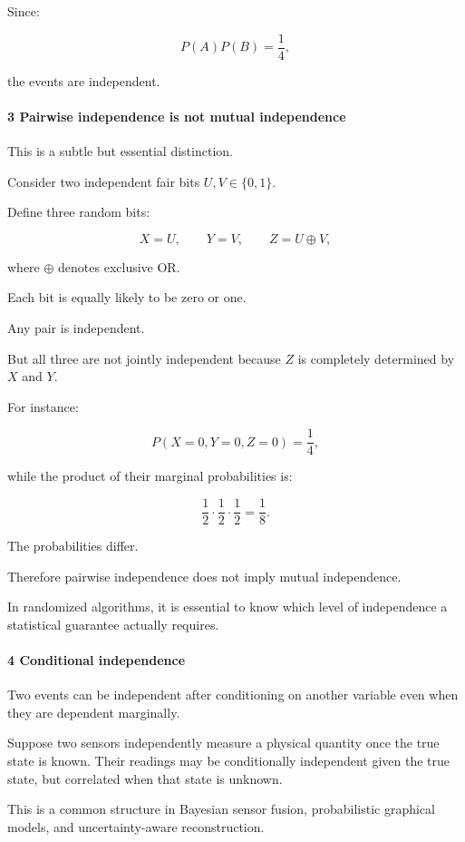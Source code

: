 Since:

\[
 P(A)P(B)=\frac14,
\]

the events are independent.

\paragraph{3 Pairwise independence is not mutual independence}\label{pairwise-independence-is-not-mutual-independence}

This is a subtle but essential distinction.

Consider two independent fair bits \(U,V\in\{0,1\}\).

Define three random bits:

\[
 X=U, \qquad Y=V, \qquad Z=U\oplus V,
\]

where \(\oplus\) denotes exclusive OR.

Each bit is equally likely to be zero or one.

Any pair is independent.

But all three are not jointly independent because \(Z\) is completely determined by \(X\) and \(Y\).

For instance:

\[
 P(X=0,Y=0,Z=0)=\frac14,
\]

while the product of their marginal probabilities is:

\[
 \frac12\cdot\frac12\cdot\frac12=\frac18.
\]

The probabilities differ.

Therefore pairwise independence does not imply mutual independence.

In randomized algorithms, it is essential to know which level of independence a statistical guarantee actually requires.

\paragraph{4 Conditional independence}\label{conditional-independence}

Two events can be independent after conditioning on another variable even when they are dependent marginally.

Suppose two sensors independently measure a physical quantity once the true state is known. Their readings may be conditionally independent given the true state, but correlated when that state is unknown.

This is a common structure in Bayesian sensor fusion, probabilistic graphical models, and uncertainty-aware reconstruction.

